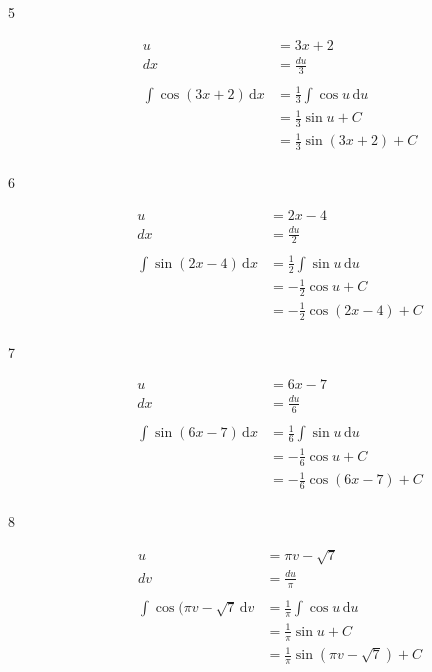 \documentclass{exam}
\begin{document}
\begin{description}

\item[5]
\begin{align*}
  u &= 3x + 2 \\
  dx &= \frac{du}{3} \\
\\
  \int \cos(3x + 2) \, \mathrm{d}x &= \frac{1}{3} \int \cos u \, \mathrm{d}u \\
  &= \frac{1}{3} \sin u + C \\
  &= \frac{1}{3} \sin(3x + 2) + C \\
\end{align*}

\item[6]
\begin{align*}
  u &= 2x - 4 \\
  dx &= \frac{du}{2} \\
\\
  \int \sin(2x - 4) \, \mathrm{d}x &= \frac{1}{2} \int \sin u \, \mathrm{d}u \\
  &= - \frac{1}{2} \cos u + C \\
  &= - \frac{1}{2} \cos (2x - 4) + C \\
\end{align*}

\item[7]
\begin{align*}
  u &= 6x - 7 \\
  dx &= \frac{du}{6} \\
\\
  \int \sin(6x - 7) \, \mathrm{d}x &= \frac{1}{6} \int \sin u \, \mathrm{d}u \\
  &= - \frac{1}{6} \cos u + C \\
  &= - \frac{1}{6} \cos (6x - 7) + C \\
\end{align*}

\item[8]
\begin{align*}
  u &= \pi v - \sqrt{7} \\
  dv &= \frac{du}{\pi} \\
\\
  \int \cos(\pi v - \sqrt{7} \, \mathrm{d}v &= \frac{1}{\pi} \int \cos u \, \mathrm{d}u \\
  &= \frac{1}{\pi} \sin u + C \\
  &= \frac{1}{\pi} \sin (\pi v - \sqrt{7}) + C \\
\end{align*}


\end{description}
\end{document}

